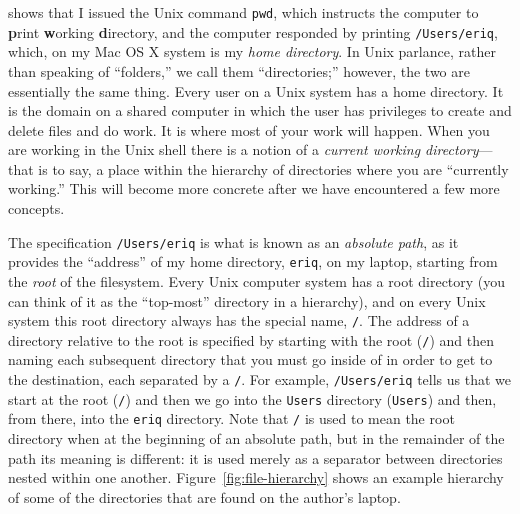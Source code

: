 \documentclass[]{krantz}
\begin{document}
shows that I issued the Unix command \texttt{pwd}, which instructs the computer to
\textbf{p}rint \textbf{w}orking \textbf{d}irectory, and the computer responded by printing
\texttt{/Users/eriq}, which, on my Mac OS X system is my \emph{home directory}.
In Unix parlance, rather than speaking of ``folders,'' we call
them ``directories;'' however, the two are essentially the same thing.
Every user
on a Unix system has a home directory. It is the domain on a shared computer
in which the user has privileges to create and delete files and do work.
It is where most of your work will happen. When you are working in the Unix
shell there is a notion of a
\emph{current working directory}---that is to say, a place within the hierarchy of
directories where you are ``currently working.'' This will become more concrete
after we have encountered a few more concepts.

The specification \texttt{/Users/eriq} is what is known as an \emph{absolute path}, as it provides the
``address'' of my home directory, \texttt{eriq}, on my laptop, starting from the \emph{root}
of the filesystem. Every Unix computer system has a root directory (you can
think of it as the ``top-most'' directory in a hierarchy), and on every Unix system
this root directory always has the special name, \texttt{/}. The address
of a directory relative to the root is specified by starting with the root (\texttt{/})
and then naming each subsequent directory that you must go inside of in order to
get to the destination, each separated by a \texttt{/}. For example, \texttt{/Users/eriq}
tells us that we start at the root (\texttt{/}) and then we go into the \texttt{Users} directory
(\texttt{Users}) and then, from there, into the \texttt{eriq} directory. Note that \texttt{/} is used to mean the root
directory when at the beginning of an absolute path, but in the remainder of the path
its meaning is different: it is used merely as a separator
between directories nested within one another. Figure~\ref{fig:file-hierarchy} shows
an example hierarchy of some of the directories that are found on the author's
laptop.
\end{document}
